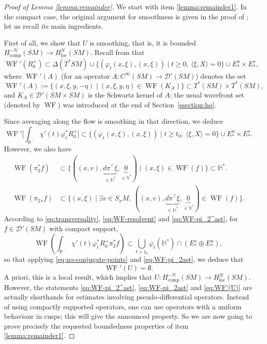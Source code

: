 \documentclass[10pt]{amsart}
\newcommand{\R}{\mathbb{R}}
\newcommand{\V}{\mathbb{V}}
\newcommand{\HH}{\mathbb{H}}
\newcommand{\mc}{\mathcal}
\DeclareMathOperator{\WF}{WF}
\theoremstyle{plain}
\theoremstyle{definition}
\begin{document}
\begin{proof}[Proof of Lemma \ref{lemma:remainder}]
We start with item \eqref{lemma:remainder1}. In the compact case, the original argument for smoothness is given in the proof of \cite[Th.\,3.1]{Guillarmou-17-1}; let us recall its main ingredients.

First of all, we show that $U$ is smoothing, that is, it is bounded $H^{-N}_{\mathrm{comp}}(SM) \to H^{N}_{\mathrm{loc}}(SM)$. Recall from \cite[Th.\,3]{Bonthonneau-Weich-17} that
\begin{equation}\label{eq:WF-resolvent}
\WF'(R_0^+) \subset \Delta(T^\ast SM) \cup \{ (\varphi_t(x,\xi),(x,\xi))\mid t\geq 0,\ \langle \xi, X\rangle = 0 \} \cup E^u_\ast \times E^s_\ast,
\end{equation}
{\color{black}where $\WF'(A)$ (for an operator $A : C^\infty(SM) \to \mc{D}'(SM)$) denotes the set
\[
\WF'(A) := \{ (x,\xi,y,-\eta) \mid (x,\xi,y,\eta) \in \WF(K_A)\} \subset T^*(SM) \times T^*(SM),
\]
and $K_A \in \mc{D}'(SM \times SM)$ is the Schwartz kernel of $A$; the usual wavefront set (denoted by $\WF$) was introduced at the end of Section~\ref{ssection:hq}.}

Since averaging along the flow is smoothing in that direction, we deduce
\[
\WF'\biggl[ \int_{\R^-} \chi'(t) \varphi_t^\ast R_0^+ \biggr] \subset \{ (\varphi_t(x,\xi),(x,\xi))\mid t\geq t_0,\ \langle \xi, X\rangle = 0 \} \cup E^u_\ast \times E^s_\ast.
\]
However, we also have
\begin{align}
\WF(\pi_2^\ast f) &\subset \{ ((x,v),\underbrace{d\pi^\top\xi}_{\in \HH^*}, \underbrace{0}_{\in \V^*})\mid (x,\xi) \in \WF(f)\}\subset \HH^\ast.\label{eq:WF-pi_2^ast}\\
\WF({\pi_2}_\ast f) &\subset \{ (x,\xi)\mid \exists v\in S_x M,\ ((x,v),\underbrace{d\pi^\top\xi}_{\in \HH^*}, \underbrace{0}_{\in \V^*}) \in \WF(f)\}.\label{eq:WF-pi_2ast}
\end{align}
According to \eqref{eq:transversality}, \eqref{eq:WF-resolvent} and \eqref{eq:WF-pi_2^ast}, for $f\in \mathcal{D}'(SM)$ with compact support,
\[
\WF\left(\int_{\R^-} \chi'(t) \varphi_t^\ast R_0^+ \pi_2^\ast f\right) \subset \bigcup_{t>t_0} \varphi_{t}(\HH^\ast) \cap (E^s_* \oplus E^u_*),
\]
so that applying \eqref{eq:no-conjugate-points} and \eqref{eq:WF-pi_2ast}, we deduce that
\begin{equation}\label{eq:WF'(U)}
\WF'(U) = \emptyset.
\end{equation}
A priori, this is a local result, which implies that $U : H^{-N}_{\mathrm{comp}}(SM)\to H^N_{\mathrm{loc}}(SM)$. However, the statements \eqref{eq:WF-pi_2^ast}, \eqref{eq:WF-pi_2ast} and \eqref{eq:WF'(U)} are actually shorthands for estimates involving pseudo-differential operators. Instead of using compactly supported operators, one can use operators with a uniform behaviour in cusps; this will give the announced property. So we are now going to prove precisely the requested boundedness properties of item \eqref{lemma:remainder1}.


\end{proof}
\end{document}

